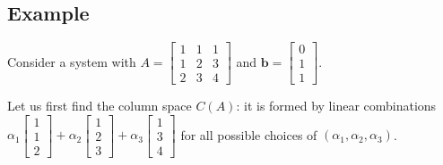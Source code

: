 \documentclass{acm_proc_article-sp}
\begin{document}
\subsection{Example}

Consider a system with
\(A = \begin{bmatrix} 1 & 1 & 1 \\ 1 & 2 & 3 \\ 2 & 3 & 4 \end{bmatrix}\)
and \(\mathbf b = \begin{bmatrix} 0 \\ 1 \\ 1 \end{bmatrix}\).


Let us first find the column space \(C(A)\): it is formed by linear combinations \(\alpha_1 \begin{bmatrix} 1 \\ 1 \\ 2 \end{bmatrix} + \alpha_2 \begin{bmatrix} 1 \\ 2 \\ 3 \end{bmatrix} + \alpha_3 \begin{bmatrix} 1 \\ 3 \\ 4 \end{bmatrix}\) for all possible choices of \((\alpha_1, \alpha_2, \alpha_3)\).
\end{document}
